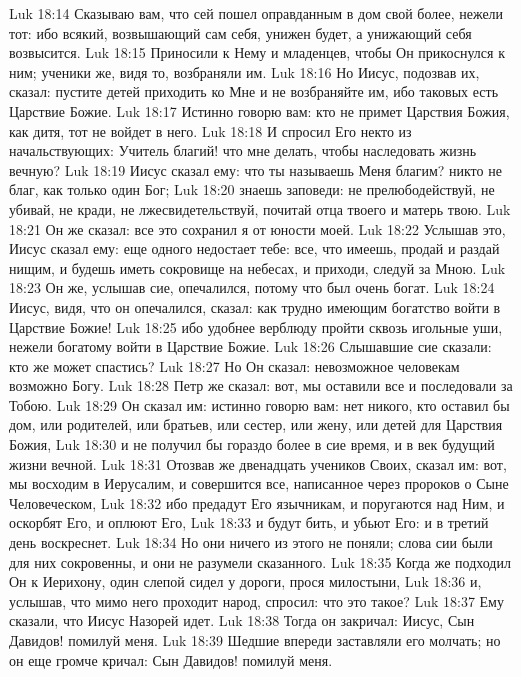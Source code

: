 \vs Luk 18:14 Сказываю вам, что сей пошел оправданным в дом свой более, нежели тот: ибо всякий, возвышающий сам себя, унижен будет, а унижающий себя возвысится.
\rsbpar\vs Luk 18:15 Приносили к Нему и младенцев, чтобы Он прикоснулся к ним; ученики же, видя то, возбраняли им.
\vs Luk 18:16 Но Иисус, подозвав их, сказал: пустите детей приходить ко Мне и не возбраняйте им, ибо таковых есть Царствие Божие.
\vs Luk 18:17 Истинно говорю вам: кто не примет Царствия Божия, как дитя, тот не войдет в него.
\rsbpar\vs Luk 18:18 И спросил Его некто из начальствующих: Учитель благий! что мне делать, чтобы наследовать жизнь вечную?
\vs Luk 18:19 Иисус сказал ему: что ты называешь Меня благим? никто не благ, как только один Бог;
\vs Luk 18:20 знаешь заповеди: не прелюбодействуй, не убивай, не кради, не лжесвидетельствуй, почитай отца твоего и матерь твою.
\vs Luk 18:21 Он же сказал: все это сохранил я от юности моей.
\vs Luk 18:22 Услышав это, Иисус сказал ему: еще одного недостает тебе: все, что имеешь, продай и раздай нищим, и будешь иметь сокровище на небесах, и приходи, следуй за Мною.
\vs Luk 18:23 Он же, услышав сие, опечалился, потому что был очень богат.
\vs Luk 18:24 Иисус, видя, что он опечалился, сказал: как трудно имеющим богатство войти в Царствие Божие!
\vs Luk 18:25 ибо удобнее верблюду пройти сквозь игольные уши, нежели богатому войти в Царствие Божие.
\vs Luk 18:26 Слышавшие сие сказали: кто же может спастись?
\vs Luk 18:27 Но Он сказал: невозможное человекам возможно Богу.
\rsbpar\vs Luk 18:28 Петр же сказал: вот, мы оставили все и последовали за Тобою.
\vs Luk 18:29 Он сказал им: истинно говорю вам: нет никого, кто оставил бы дом, или родителей, или братьев, или сестер, или жену, или детей для Царствия Божия,
\vs Luk 18:30 и не получил бы гораздо более в сие время, и в век будущий жизни вечной.
\rsbpar\vs Luk 18:31 Отозвав же двенадцать учеников Своих, сказал им: вот, мы восходим в Иерусалим, и совершится все, написанное через пророков о Сыне Человеческом,
\vs Luk 18:32 ибо предадут Его язычникам, и поругаются над Ним, и оскорбят Его, и оплюют Его,
\vs Luk 18:33 и будут бить, и убьют Его: и в третий день воскреснет.
\vs Luk 18:34 Но они ничего из этого не поняли; слова сии были для них сокровенны, и они не разумели сказанного.
\rsbpar\vs Luk 18:35 Когда же подходил Он к Иерихону, один слепой сидел у дороги, прося милостыни,
\vs Luk 18:36 и, услышав, что мимо него проходит народ, спросил: что это такое?
\vs Luk 18:37 Ему сказали, что Иисус Назорей идет.
\vs Luk 18:38 Тогда он закричал: Иисус, Сын Давидов! помилуй меня.
\vs Luk 18:39 Шедшие впереди заставляли его молчать; но он еще громче кричал: Сын Давидов! помилуй меня.
